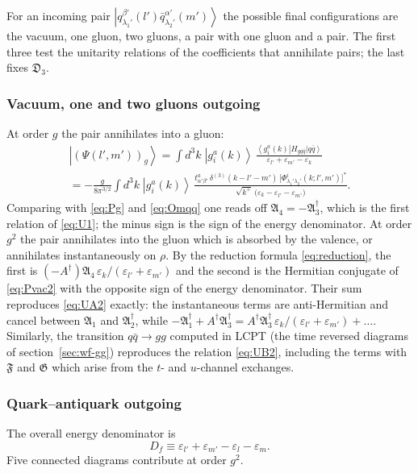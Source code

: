 \documentclass[11pt,a4paper]{article}
\numberwithin{equation}{section}
\newcommand{\mf}[1]{\mathfrak{#1}}
\newcommand{\eps}{\varepsilon}
\newcommand{\dg}{\dagger}
\newcommand{\dthree}{\delta^{(3)}}
\newcommand{\ket}[1]{\left|#1\right\rangle}
\newcommand{\bra}[1]{\left\langle#1\right|}
\newcommand{\Ph}{\Phi}
\newcommand{\qk}[3]{q^{#1}_{#2}(#3)}
\newcommand{\aqk}[3]{\bar q^{#1}_{#2}(#3)}
\newcommand{\gl}[3]{g^{#1}_{#2}(#3)}
\begin{document}
For an incoming pair $\ket{\qk{\beta'}{\lambda_{1}'}{l'}\aqk{\alpha'}{\lambda_{2}'}{m'}}$ the possible
final configurations are the vacuum, one gluon, two gluons, a pair with one gluon and a pair. The
first three test the unitarity relations of the coefficients that annihilate pairs; the last
fixes $\mf D_{3}$.

\subsubsection{Vacuum, one and two gluons outgoing}

At order $g$ the pair annihilates into a gluon:
\begin{multline}
\ket{(\Psi(l',m'))_{g}}=\int\!d^{3}k\;\ket{\gl{a}{i}{k}}\,
\frac{\bra{\gl{a}{i}{k}}H_{gq\bar q}\ket{q\bar q}}{\eps_{l'}+\eps_{m'}-\eps_{k}}\\
=-\frac{g}{8\pi^{3/2}}\int\!d^{3}k\;\ket{\gl{a}{i}{k}}\,
\frac{t^{a}_{\alpha'\beta'}\,\dthree(k-l'-m')\,\big[\Ph^{i}_{\lambda_{1}'\lambda_{2}'}(k;l',m')\big]^{*}}
{\sqrt{k^{+}}\,\big(\eps_{k}-\eps_{l'}-\eps_{m'}\big)} .
\label{eq:Pqq-g}
\end{multline}
Comparing with \eqref{eq:Pg} and \eqref{eq:Omqq} one reads off
$\mf A_{4}=-\mf A_{3}^{\dg}$, which is the first relation of \eqref{eq:U1}; the minus sign is the
sign of the energy denominator. At order $g^{2}$ the pair annihilates into the gluon which is
absorbed by the valence, or annihilates instantaneously on $\rho$. By the reduction formula
\eqref{eq:reduction}, the first is $(-A^{\dg})\mf A_{4}\,\eps_{k}/(\eps_{l'}+\eps_{m'})$ and the second
is the Hermitian conjugate of \eqref{eq:Pvac2} with the opposite sign of the energy
denominator. Their sum reproduces \eqref{eq:UA2} exactly: the instantaneous terms are
anti-Hermitian and cancel between $\mf A_{1}$ and $\mf A_{2}^{\dg}$, while
$-\mf A_{1}^{\dg}+A^{\dg}\mf A_{3}^{\dg}=A^{\dg}\mf A_{3}^{\dg}\,\eps_{k}/(\eps_{l'}+\eps_{m'})+\dots$.
Similarly, the transition $q\bar q\to gg$ computed in LCPT (the time reversed diagrams of
section~\ref{sec:wf-gg}) reproduces the relation \eqref{eq:UB2}, including the terms with $\mf F$
and $\mf G$ which arise from the $t$- and $u$-channel exchanges.

\subsubsection{Quark--antiquark outgoing}

The overall energy denominator is
\begin{equation}
D_{f}\equiv\eps_{l'}+\eps_{m'}-\eps_{l}-\eps_{m}.
\end{equation}
Five connected diagrams contribute at order $g^{2}$.
\end{document}

